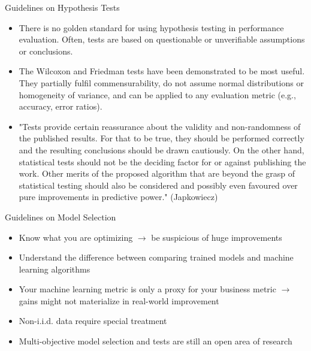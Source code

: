 \documentclass[11pt,compress,t,notes=noshow, aspectratio=169, xcolor=table]{beamer}
\begin{document}
\begin{frame}{Guidelines on Hypothesis Tests}

\vfill
\begin{itemize}
    \item There is no golden standard for using hypothesis testing in performance evaluation. Often, tests are based on questionable or unverifiable assumptions or conclusions.
    \item The Wilcoxon and Friedman tests have been demonstrated to be most useful. They partially fulfil commensurability, do not assume normal distributions or homogeneity of variance, and can be applied to any evaluation metric (e.g., accuracy, error ratios).
    \item  "Tests provide certain reassurance about the validity and non-randomness of the published  results. For that to be true, they should be performed correctly and the resulting conclusions should  be drawn cautiously. On the other hand, statistical tests should not be the deciding factor for or  against publishing the work. Other merits of the proposed algorithm that are beyond the grasp of  statistical testing should also be considered and possibly even favoured over pure improvements in  predictive power." (Japkowiecz)
\end{itemize}
\vfill

\end{frame}

\begin{frame}{Guidelines on Model Selection}
    \vfill
    \begin{itemize}
        \item Know what you are optimizing $\rightarrow$ be suspicious of huge improvements
        \item Understand the difference between comparing trained models and machine learning algorithms
        \item Your machine learning metric is only a proxy for your business metric $\rightarrow$ gains might not materialize in real-world improvement
        \item Non-i.i.d. data require special treatment
        \item Multi-objective model selection and tests are still an open area of research
    \end{itemize}
    \vfill
\end{frame}


\endlecture
\end{document}
